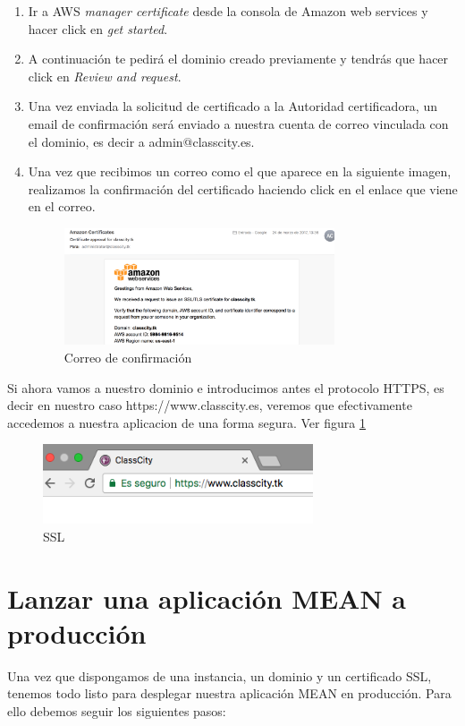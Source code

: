 \begin{itemize}
     \begin{enumerate}
        \item Ir a AWS \textit{manager certificate} desde la consola de Amazon web services y hacer click en \textit{get started}.
        \item A continuación te pedirá el dominio creado previamente y tendrás que hacer click en \textit{Review and request}.
        \item Una vez enviada la solicitud de certificado a la Autoridad certificadora, un email de confirmación será enviado a nuestra cuenta de correo vinculada con el dominio, es decir a admin@classcity.es.
        \item Una vez que recibimos un correo como el que aparece en la siguiente imagen, realizamos la confirmación del certificado haciendo click en el enlace que viene en el correo.
        \begin{figure}[!h]
        \centering
        \includegraphics[width=80mm]{img/despliegue/ssl.png}
        \caption{Correo de confirmación}
        \end{figure}
    \end{enumerate}

    Si ahora vamos a nuestro dominio e introducimos antes el protocolo HTTPS, es decir en nuestro caso https://www.classcity.es, veremos que efectivamente accedemos a nuestra aplicacion de una forma segura. Ver figura \ref{img:dominio}

    \begin{figure}[!h]
    \centering
    \includegraphics[width=80mm]{img/despliegue/https.png}
    \caption{SSL}
    \label{img:dominio}
    \end{figure}

\end{itemize}

\section{Lanzar una aplicación MEAN a producción} Una vez que dispongamos de una instancia, un dominio y un certificado SSL, tenemos todo listo para desplegar nuestra aplicación MEAN en producción. Para ello debemos seguir los siguientes pasos:

